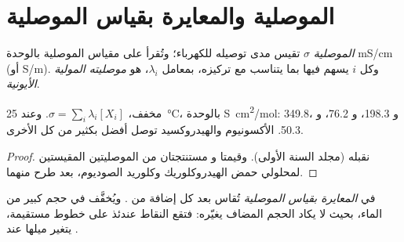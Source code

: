 \section{الموصلية والمعايرة بقياس الموصلية}

\begin{definition}\label{def:g12:ph-conductivity-titrations:conductivity}
\emph{الموصلية} $\sigma$ 
تقيس مدى توصيله للكهرباء؛ وتُقرأ على مقياس الموصلية
بالوحدة \si{mS/cm} (أو \si{S/m}). وكل  $i$ يسهم فيها
بما يتناسب مع تركيزه، بمعامل $\lambda_i$، هو
\emph{موصليته المولية الأيونية}.
\end{definition}

\begin{proposition}\label{prop:g12:ph-conductivity-titrations:kohlrausch}
 مخفف، $\sigma = \sum_i \lambda_i [X_i]$. وعند
\qty{25}{\celsius}، بالوحدة \si{S.cm^2/mol}:  349.8، و 198.3،
و 76.2، و 50.3.  الأكسونيوم والهيدروكسيد توصل
أفضل بكثير من كل  الأخرى.
\end{proposition}

\begin{proof}
نقبله (مجلد السنة الأولى). وقيمتا  و مستنتجتان من
الموصليتين المقيستين لمحلولي حمض الهيدروكلوريك وكلوريد الصوديوم،
بعد طرح   منهما.
\end{proof}

\begin{definition}\label{def:g12:ph-conductivity-titrations:conductimetric}
في \emph{المعايرة بقياس الموصلية}
تُقاس  بعد كل إضافة من . ويُخفَّف  في حجم كبير من الماء، بحيث لا يكاد الحجم
المضاف يغيّره: فتقع النقاط عندئذ على خطوط مستقيمة، يتغير
ميلها عند .
\end{definition}

